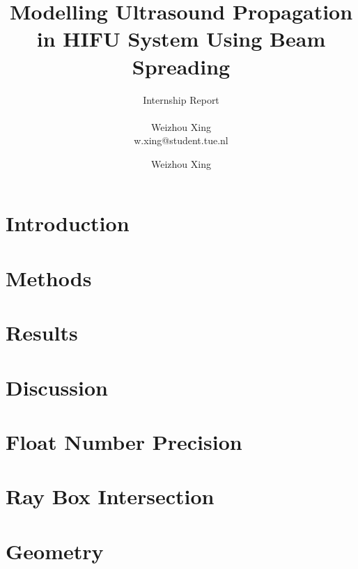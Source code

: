 \documentclass[12pt,a4paper]{report}
\title{Modelling Ultrasound Propagation in HIFU System Using Beam Spreading}
\subtitle{Internship Report \\~\\ \small{Weizhou Xing \\ \small{w.xing@student.tue.nl}}}
\author{Weizhou Xing}
\begin{document}
\maketitle
\tableofcontents



\chapter{Introduction}


\chapter{Methods}


\chapter{Results} \label{sec:results}


\chapter{Discussion}


\begin{appendices}
\chapter{Float Number Precision} \label{ap:floatnumber}

\chapter{Ray Box Intersection} \label{ap:rayboxintersection}

\chapter{Geometry} \label{ap:geometry}

\end{appendices}

\printbibliography[
heading=bibintoc,
title={References}
] %

\clearpage
\end{document}
